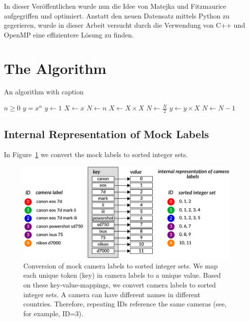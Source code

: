 \documentclass[sigconf]{acmart}
\begin{document}
In dieser Veröffentlichen wurde nun die Idee von Matejka und Fitzmaurice aufgegriffen und optimiert. Anstatt den neuen Datensatz mittels Python zu gegerieren, wurde in dieser Arbeit versucht durch die Verwendung von C++ und OpenMP eine effizientere Lösung zu finden.  




\section{The Algorithm}

\begin{algorithm}
  \caption{An algorithm with caption}\label{alg:cap}
  \begin{algorithmic}
  \Require $n \geq 0$
  \Ensure $y = x^n$
  \State $y \gets 1$
  \State $X \gets x$
  \State $N \gets n$
      \State $X \gets X \times X$
      \State $N \gets \frac{N}{2}$  
      \State $y \gets y \times X$
      \State $N \gets N - 1$
  \EndIf
  \EndWhile
  \end{algorithmic}
\end{algorithm}
  

\subsection{Internal Representation of Mock Labels}
\label{sub:sec:internal}

In Figure~\ref{fig:integer:sets} we convert the mock labels to sorted integer sets.



\begin{figure}[htbp]
  \centering
  \includegraphics[width=\linewidth]{./graphics/integer_sets.pdf}
  \caption{Conversion of mock camera labels to sorted integer sets. 
We map each unique token (key) in camera labels to a unique value. 
Based on these key-value-mappings, we convert camera labels to sorted integer sets. 
A camera can have different names in different countries. Therefore, repeating IDs reference the same cameras (see, for example, ID=3).} 
  \label{fig:integer:sets}
\end{figure}
\end{document}
